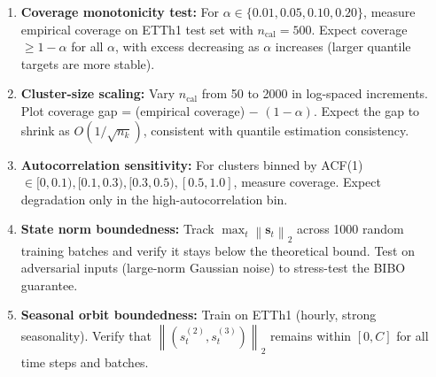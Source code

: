 \documentclass[11pt]{article}
\newcommand{\norm}[1]{\left\lVert#1\right\rVert}
\begin{document}
\begin{enumerate}
    \item \textbf{Coverage monotonicity test:} For $\alpha \in \{0.01, 0.05, 0.10, 0.20\}$, measure empirical coverage on ETTh1 test set with $n_{\text{cal}} = 500$. Expect coverage $\geq 1-\alpha$ for all $\alpha$, with excess decreasing as $\alpha$ increases (larger quantile targets are more stable).

    \item \textbf{Cluster-size scaling:} Vary $n_{\text{cal}}$ from 50 to 2000 in log-spaced increments. Plot coverage gap = (empirical coverage) $-$ $(1-\alpha)$. Expect the gap to shrink as $O(1/\sqrt{n_k})$, consistent with quantile estimation consistency.

    \item \textbf{Autocorrelation sensitivity:} For clusters binned by ACF(1) $\in [0, 0.1), [0.1, 0.3), [0.3, 0.5), [0.5, 1.0]$, measure coverage. Expect degradation only in the high-autocorrelation bin.

    \item \textbf{State norm boundedness:} Track $\max_t \norm{\mathbf{s}_t}_2$ across 1000 random training batches and verify it stays below the theoretical bound. Test on adversarial inputs (large-norm Gaussian noise) to stress-test the BIBO guarantee.

    \item \textbf{Seasonal orbit boundedness:} Train on ETTh1 (hourly, strong seasonality). Verify that $\norm{(s_t^{(2)}, s_t^{(3)})}_2$ remains within $[0, C]$ for all time steps and batches.
\end{enumerate}
\end{document}
